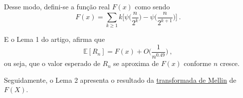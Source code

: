 Desse modo, defini-se a função real $F(x)$ como sendo
\[ F(x) =  \sum_{k \geq 1} k \Big[ \psi \Big( \frac{n}{2^k} \Big) - \psi \Big( \frac{n}{2^{k+1}} \Big) \Big] \ . \]

E o Lema 1 do artigo, afirma que 
\[ \mathbb{E}[R_n] = F(x) + O \Big( \frac{1}{n^{0.49}} \Big) \ , \]
ou seja, que o valor esperado de $R_n$ se aproxima de $F(x)$ conforme $n$ cresce.

Seguidamente, o Lema 2 apresenta o resultado da \hyperref[ap:mellin]{transformada de Mellin} de $F(X)$.
